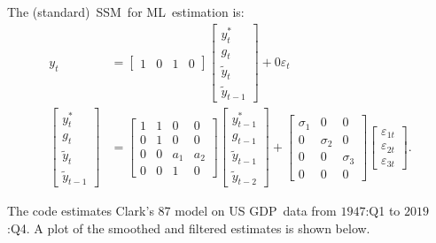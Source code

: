 \documentclass[a4paper,12pt]{article}
\begin{document}
The (standard)\ SSM\ for ML\ estimation is:%
\begin{align}
y_{t}& =%
\begin{bmatrix}
1 & 0 & 1 & 0%
\end{bmatrix}%
\begin{bmatrix}
y_{t}^{\ast } \\
g_{t} \\
\tilde{y}_{t} \\
\tilde{y}_{t-1}%
\end{bmatrix}%
+0\varepsilon _{t} \\[4mm]
\begin{bmatrix}
y_{t}^{\ast } \\
g_{t} \\
\tilde{y}_{t} \\
\tilde{y}_{t-1}%
\end{bmatrix}%
& =%
\begin{bmatrix}
1 & 1 & 0 & 0 \\
0 & 1 & 0 & 0 \\
0 & 0 & a_{1} & a_{2} \\
0 & 0 & 1 & 0%
\end{bmatrix}%
\begin{bmatrix}
y_{t-1}^{\ast } \\
g_{t-1} \\
\tilde{y}_{t-1} \\
\tilde{y}_{t-2}%
\end{bmatrix}%
+%
\begin{bmatrix}
\sigma _{1} & 0 & 0 \\
0 & \sigma _{2} & 0 \\
0 & 0 & \sigma _{3} \\
0 & 0 & 0%
\end{bmatrix}%
\begin{bmatrix}
\varepsilon _{1t} \\
\varepsilon _{2t} \\
\varepsilon _{3t}%
\end{bmatrix}%
.
\end{align}

\bigskip

The code estimates Clark's 87 model on US GDP\ data from $1947$:Q1 to $2019$%
:Q4. A plot of the smoothed and filtered estimates is shown below.
\end{document}
